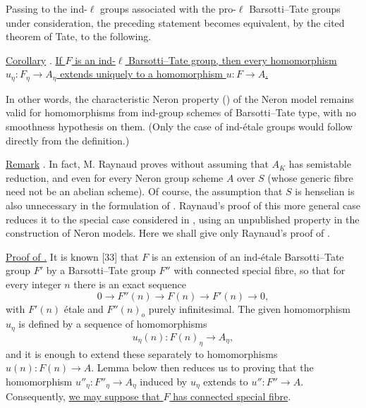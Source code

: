 Passing to the ind-$\ell$ groups associated with the pro-$\ell$
Barsotti--Tate groups under consideration, the preceding statement
becomes equivalent, by the cited theorem of Tate, to the following.

\medskip
\noindent
\underline{Corollary} . \underline{If $F$ is an ind-$\ell$
Barsotti--Tate group, then every homomorphism
$u_\eta:F_\eta\longrightarrow A_\eta$ extends uniquely to a
homomorphism $u:F\longrightarrow A$.}

In other words, the characteristic Neron property () of the
Neron model remains valid for homomorphisms from ind-group schemes of
Barsotti--Tate type, with no smoothness hypothesis on them. (Only the
case of ind-\'{e}tale groups would follow directly from the
definition.)

\medskip
\noindent
\underline{Remark} . In fact, M. Raynaud proves  without
assuming that $A_K$ has semistable reduction, and even for every Neron
group scheme $A$ over $S$ (whose generic fibre need not be an abelian
scheme). Of course, the assumption that $S$ is henselian is also
unnecessary in the formulation of . Raynaud's proof of this more
general case reduces it to the special case considered in , using
an unpublished property in the construction of Neron models. Here we
shall give only Raynaud's proof of .

\medskip
\noindent
\underline{Proof of .} It is known [33] that $F$ is an extension
of an ind-\'{e}tale Barsotti--Tate group $F'$ by a Barsotti--Tate group
$F''$ with connected special fibre, so that for every integer $n$
there is an exact sequence
\[
 0\longrightarrow F''(n)\longrightarrow F(n)
 \longrightarrow F'(n)\longrightarrow0,
\]
with $F'(n)$ \'{e}tale and $F''(n)_o$ purely infinitesimal.
The given homomorphism $u_\eta$ is defined by a sequence of
homomorphisms
\[
 u_\eta(n):F(n)_\eta\longrightarrow A_\eta,
\]
and it is enough to extend these separately to homomorphisms
$u(n):F(n)\longrightarrow A$. Lemma  below then reduces us to
proving that the homomorphism
$u''_\eta:F''_\eta\longrightarrow A_\eta$ induced by $u_\eta$
extends to $u'':F''\longrightarrow A$. Consequently, \underline{we
may suppose that $F$ has connected special fibre}.

